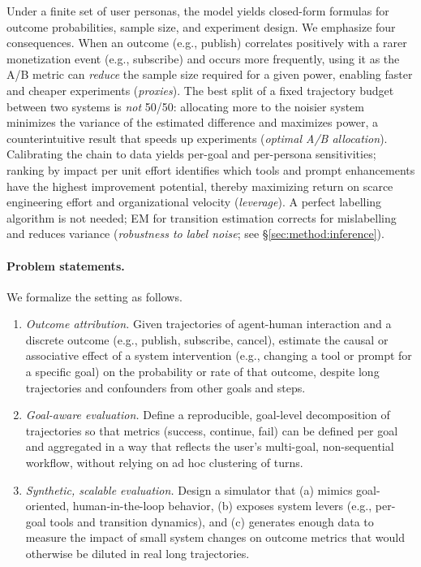 Under a finite set of user personas, the model yields closed-form formulas for outcome probabilities, sample size, and experiment design. We emphasize four consequences. When an outcome (e.g., publish) correlates positively with a rarer monetization event (e.g., subscribe) and occurs more frequently, using it as the A/B metric can \emph{reduce} the sample size required for a given power, enabling faster and cheaper experiments (\emph{proxies}). The best split of a fixed trajectory budget between two systems is \emph{not} 50/50: allocating more to the noisier system minimizes the variance of the estimated difference and maximizes power, a counterintuitive result that speeds up experiments (\emph{optimal A/B allocation}). Calibrating the chain to data yields per-goal and per-persona sensitivities; ranking by impact per unit effort identifies which tools and prompt enhancements have the highest improvement potential, thereby maximizing return on scarce engineering effort and organizational velocity (\emph{leverage}). A perfect labelling algorithm is not needed; EM for transition estimation corrects for mislabelling and reduces variance (\emph{robustness to label noise}; see \S\ref{sec:method:inference}).

\paragraph{Problem statements.}
We formalize the setting as follows.

\begin{enumerate}
  \item \emph{Outcome attribution.} Given trajectories of agent-human interaction and a discrete outcome (e.g., publish, subscribe, cancel), estimate the causal or associative effect of a system intervention (e.g., changing a tool or prompt for a specific goal) on the probability or rate of that outcome, despite long trajectories and confounders from other goals and steps.

  \item \emph{Goal-aware evaluation.} Define a reproducible, goal-level decomposition of trajectories so that metrics (success, continue, fail) can be defined per goal and aggregated in a way that reflects the user's multi-goal, non-sequential workflow, without relying on ad hoc clustering of turns.

  \item \emph{Synthetic, scalable evaluation.} Design a simulator that (a) mimics goal-oriented, human-in-the-loop behavior, (b) exposes system levers (e.g., per-goal tools and transition dynamics), and (c) generates enough data to measure the impact of small system changes on outcome metrics that would otherwise be diluted in real long trajectories.
\end{enumerate}

